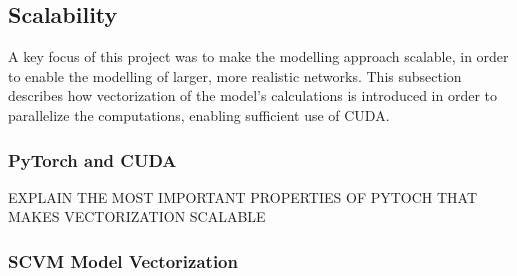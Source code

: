 \subsection{Scalability}
\label{sec:Method:Scalability}
A key focus of this project was to make the modelling approach scalable, in order to enable the modelling of larger, more realistic networks.
This subsection describes how vectorization of the model's calculations is introduced in order to parallelize the computations, enabling sufficient use of CUDA.

\subsubsection{PyTorch and CUDA}
\label{sec:Method:Scalability:PyTorch}
EXPLAIN THE MOST IMPORTANT PROPERTIES OF PYTOCH THAT MAKES VECTORIZATION SCALABLE



\subsubsection{SCVM Model Vectorization}
